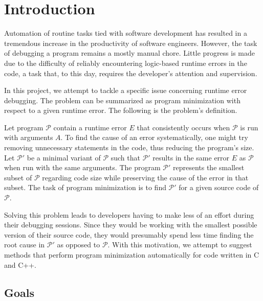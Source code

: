 \chapter{Introduction}


Automation of routine tasks tied with software development has resulted in 
a tremendous increase in the productivity of software engineers. 
However, the task of debugging a program remains a mostly manual chore. 
Little progress is made due to the difficulty of reliably encountering 
logic-based runtime errors in the code, a task that, to this day, requires 
the developer's attention and supervision. 

In this project, we attempt to tackle a specific issue concerning runtime 
error debugging. 
The problem can be summarized as program minimization with respect to a given 
runtime error. 
The following is the problem's definition.

Let program $\mathcal{P}$ contain a runtime error $E$ that consistently 
occurs when $\mathcal{P}$ is run with arguments $A$. 
To find the cause of an error systematically, one might try removing 
unnecessary statements in the code, thus reducing the program's size. 
Let $\mathcal{P'}$ be a minimal variant of $\mathcal{P}$ such that 
$\mathcal{P'}$ results in the same error $E$ as $\mathcal{P}$ when run with 
the same arguments. 
The program $\mathcal{P'}$ represents the smallest subset of $\mathcal{P}$ 
regarding code size while preserving the cause of the error in that subset. 
The task of program minimization is to find $\mathcal{P'}$ for a given source 
code of $\mathcal{P}$.

Solving this problem leads to developers having to make less of an effort 
during their debugging sessions. 
Since they would be working with the smallest possible version of their 
source code, they would presumably spend less time finding the root cause 
in $\mathcal{P'}$ as opposed to $\mathcal{P}$.  
With this motivation, we attempt to suggest methods that perform program 
minimization automatically for code written in C and C++.

\section{Goals}

